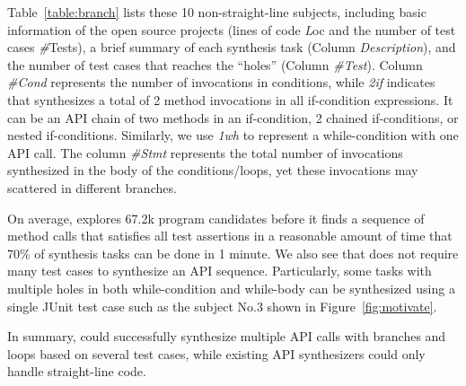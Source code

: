    Table~\ref{table:branch}  lists these 10 non-straight-line subjects, including basic information of the open source projects (lines of code {\emph Loc} and the number of test cases {\emph \#Tests}), a brief summary of each synthesis task (Column {\it Description}),  and the number of test cases that reaches the ``holes'' (Column  {\it \#Test}). Column {\it \#Cond} represents the number of invocations in conditions, while {\it 2if} indicates that \tool synthesizes a total of 2 method invocations in all if-condition expressions. It can be an API chain of two methods in an if-condition, 2 chained if-conditions, or nested if-conditions. Similarly, we use {\it 1wh} to represent  a while-condition with one API call. The column {\it \#Stmt} represents the total number of invocations synthesized in the body of the conditions/loops, yet these invocations may scattered in different branches.  %



On average, \tool explores 67.2k program candidates before it finds a sequence of method calls that satisfies all test assertions  in a reasonable amount of time that 70\% of synthesis tasks can be done in 1 minute. We also see that \tool does not require many test cases to synthesize an API sequence. Particularly, some tasks with multiple holes in both while-condition and while-body can be synthesized using a single JUnit test case such as the subject No.3 shown in Figure~\ref{fig:motivate}. %




In summary, \tool could successfully synthesize multiple API calls with branches and loops based on several test cases, while existing API synthesizers could only handle straight-line code. %


